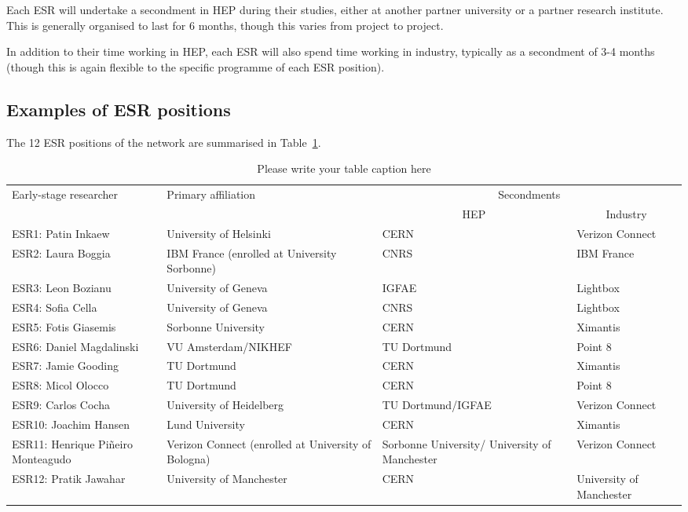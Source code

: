 Each ESR will undertake a secondment in HEP during their studies, either at another partner university or a partner research institute. This is generally organised to last for 6 months, though this varies from project to project.\par

In addition to their time working in HEP, each ESR will also spend time working in industry, typically as a secondment of 3-4 months (though this is again flexible to the specific programme of each ESR position).

\subsection{Examples of ESR positions}
\label{esr-examples}
The 12 ESR positions of the network are summarised in Table~\ref{esr-positions}.\par
\begin{table}[h!]
    \footnotesize
    \centering
    \caption{Please write your table caption here}
    \label{esr-positions}       
    \begin{tabular}{p{3.1cm}p{3.25cm}p{2.85cm}p{2cm}}
    \hline
    \multirow{2}{*}{\centering Early-stage researcher} & \multirow{2}{*}{\centering Primary affiliation} &  \multicolumn{2}{c}{Secondments} \\
    & & \multicolumn{1}{c}{HEP} & \multicolumn{1}{c}{Industry} \\\hline 
    ESR1: Patin Inkaew & University of Helsinki & CERN & Verizon Connect \\
    ESR2: Laura Boggia & IBM France (enrolled at University Sorbonne) & CNRS & IBM France \\
    ESR3: Leon Bozianu & University of Geneva & IGFAE
     & Lightbox \\
    ESR4: Sofia Cella & University of Geneva & CNRS & Lightbox \\
    ESR5: Fotis Giasemis & Sorbonne University & CERN & Ximantis \\
    ESR6: Daniel Magdalinski & VU Amsterdam/NIKHEF & TU Dortmund & Point 8 \\
    ESR7: Jamie Gooding & TU Dortmund & CERN & Ximantis \\
    ESR8: Micol Olocco & TU Dortmund & CERN & Point 8 \\
    ESR9: Carlos Cocha & University of Heidelberg & TU Dortmund/IGFAE & Verizon Connect \\
    ESR10: Joachim Hansen & Lund University & CERN & Ximantis \\
    ESR11: Henrique Pi\~neiro Monteagudo & Verizon Connect (enrolled at University of Bologna) & Sorbonne University/ University of Manchester & Verizon Connect \\
    ESR12: Pratik Jawahar & University of Manchester & CERN & University of Manchester \\\hline
    \end{tabular}
\end{table}
